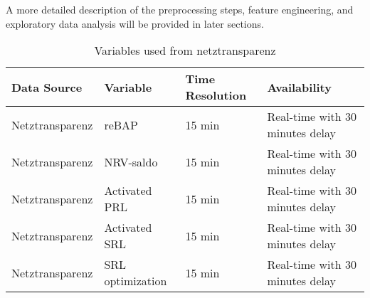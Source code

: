 \documentclass[class=scrbook, crop=false]{standalone}
\begin{document}
A more detailed description of the preprocessing steps, feature engineering, and exploratory data analysis will be provided in later sections.

\begin{table}[]
\begin{tabular}{l|l|l|l}
 Data Source & Variable &  Time Resolution & Availability  \\\hline
 Netztransparenz & reBAP & 15 min & Real-time with 30 minutes delay \\
 Netztransparenz & NRV-saldo & 15 min & Real-time with 30 minutes delay \\
 Netztransparenz & Activated PRL & 15 min & Real-time with 30 minutes delay \\
 Netztransparenz & Activated SRL & 15 min & Real-time with 30 minutes delay \\
 Netztransparenz & SRL optimization & 15 min & Real-time with 30 minutes delay \\
 
\end{tabular}
\caption{Variables used from netztransparenz}
\label{Table::Energy_Data_Netztransparenz}
\end{table}
\end{document}
